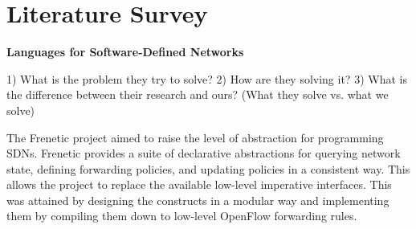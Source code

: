
\section{Literature Survey}

\textbf{Languages for Software-Defined Networks}

1) What is the problem they try to solve?
2) How are they solving it?
3) What is the difference between their research and ours?  (What they solve vs. what we solve)


The Frenetic project aimed to raise the level of abstraction for programming SDNs. Frenetic provides a suite of declarative abstractions for querying network state, defining forwarding policies, and updating policies in a consistent way. This allows the project to replace the available low-level imperative interfaces. This was attained by designing the constructs in a modular way and implementing them by compiling them down to low-level OpenFlow forwarding rules. \cite{Foster2013}